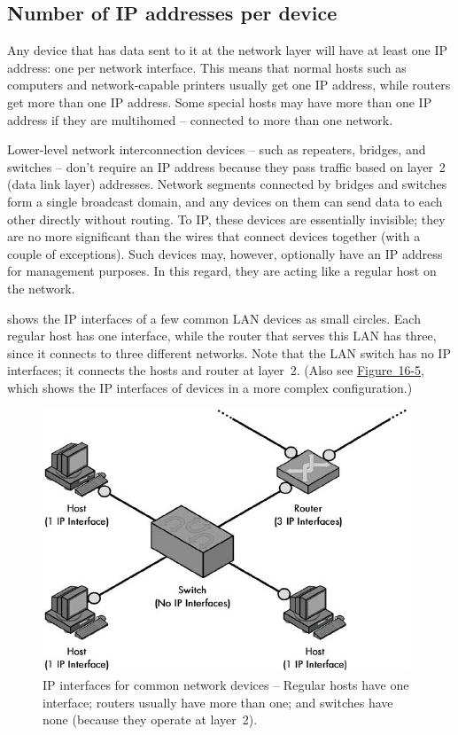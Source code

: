 \subsection{Number of IP addresses per device}

Any device that has data sent to it at the network layer will have at
least one IP address: one per network interface. This means that normal
hosts such as computers and network-capable printers usually get one IP
address, while routers get more than one IP address. Some special hosts
may have more than one IP address if they are multihomed -- connected to
more than one network.

Lower-level network interconnection devices -- such as repeaters,
bridges, and switches -- don't require an IP address because they pass
traffic based on layer~2 (data link layer) addresses. Network segments
connected by bridges and switches form a single broadcast domain, and
any devices on them can send data to each other directly without
routing. To IP, these devices are essentially invisible; they are no
more significant than the wires that connect devices together (with a
couple of exceptions). Such devices may, however, optionally have an IP
address for management purposes. In this regard, they are acting like a
regular host on the network.

 shows the IP interfaces of a few common LAN devices as small circles.
Each regular host has one interface, while the router that serves this LAN has three, since it connects to three different networks.
Note that the LAN switch has no IP interfaces; it connects the hosts and router at layer~2.
(Also see \protect\hyperlink{ch16s06.htmlux5cux23multihomed_devices_on_an_ip_internetwork}{Figure~16-5}, which shows the IP interfaces of devices in a more complex configuration.)


\begin{figure}
   \centering
   \includegraphics[width=.6\textwidth]{images/ip-interfaces.jpg}
   \caption{IP interfaces for common network devices -- Regular hosts have one interface; routers usually have more than one; and switches have none (because they operate at layer~2).}
   \label{fig:ip-interfaces}
\end{figure}



